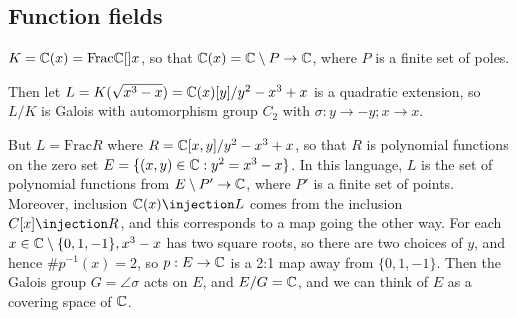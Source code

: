 \documentclass[a4paper, 10pt, twocolumn]{amsart}
\begin{document}
\subsection*{Function fields}
$K = \mathbb{C}(x) = \text{Frac}\mathbb{C}[]x$, so that $\mathbb{C}(x) = \mathbb{C}\setminus P \to \mathbb{C}$, where $P$ is a finite set of poles.

Then let $L = K(\sqrt{x^3-x}) = \mathbb{C}(x)[y]/y^2-x^3+x$ is a quadratic extension, so $L/K$ is Galois with automorphism group $C_2$ with $\sigma:y \to -y; x\to x$.

But $L = \text{Frac}R$ where $R = \mathbb{C}[x,y]/y^2-x^3+x$, so that $R$ is polynomial functions on the zero set $E = \{(x,y)\in \mathbb{C} : y^2=x^3-x\}$. In this language, $L$ is the set of polynomial functions from $E \setminus P' \to \mathbb{C}$, where $P'$ is a finite set of points. Moreover, inclusion $\C(x) \injection L$ comes from the inclusion $C[x] \injection R$, and this corresponds to a map going the other way. For each $x \in \mathbb{C}\setminus\{0,1,-1\}, x^3-x$ has two square roots, so there are two choices of $y$, and hence $\#p^{-1}(x) = 2$, so $p:E\to \mathbb{C}$ is a 2:1 map away from $\{0,1,-1\}$. Then the Galois group $G = \angle{\sigma}$ acts on $E$, and $E/G = \mathbb{C}$, and we can think of $E$ as a covering space of $\mathbb{C}$.


\end{document}
